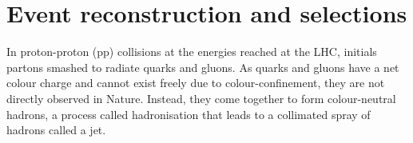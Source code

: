 \section{Event reconstruction and selections}
\label{label:EventsReconstruction}

In proton-proton (pp) collisions at the energies reached at the LHC,  initials partons smashed to radiate quarks and gluons. As quarks and gluons have a net colour charge and cannot exist freely due to colour-confinement, they are not directly observed in Nature. 
Instead, they come together to form colour-neutral hadrons, a process called hadronisation that leads to a collimated spray of hadrons called a jet.
